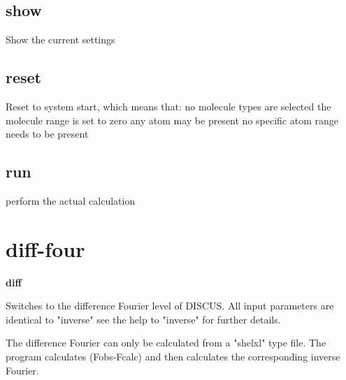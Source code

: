\subsection*{show}
\par
Show the current settings 
\subsection*{reset}
\par
Reset to system start, which means that: 
no molecule types are selected 
the molecule range is set to zero 
any atom may be present 
no specific atom range needs to be present 
\subsection*{run}
\par
perform the actual calculation 
\section{diff-four}
{\bf diff \par }
\par
\vspace{3pt}
Switches to the difference Fourier level of DISCUS. 
All input parameters are identical to "inverse" see the help to 
"inverse" for further details. 
\par
The difference Fourier can only be calculated from a "shelxl" type 
file. The program calculates (Fobs-Fcalc) and then calculates the 
corresponding inverse Fourier. 
